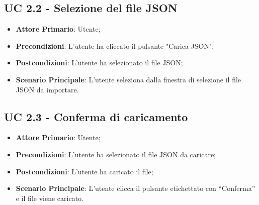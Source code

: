 		\subsection{UC 2.2 - Selezione del file JSON}
		\begin{itemize}
			\item\textbf{Attore Primario}: Utente;
			\item\textbf{Precondizioni}: L’utente ha cliccato il pulsante "Carica JSON";
			\item\textbf{Postcondizioni}: L’utente ha selezionato il file JSON;
			\item\textbf{Scenario Principale}: L’utente seleziona dalla finestra di selezione il file JSON da importare.
		\end{itemize}

		\subsection{UC 2.3 - Conferma di caricamento}
		\begin{itemize}
			\item\textbf{Attore Primario}: Utente;
			\item\textbf{Precondizioni}: L’utente ha selezionato il file JSON da caricare;
			\item\textbf{Postcondizioni}: L’utente ha caricato il file; 
			\item\textbf{Scenario Principale}: L’utente clicca il pulsante etichettato con “Conferma” e il file viene caricato.
		\end{itemize}
		

	
	

